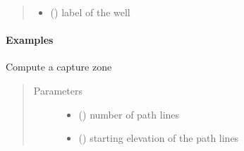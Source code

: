 \documentclass[letterpaper,10pt,english]{sphinxmanual}
\begin{document}
\begin{fulllineitems}
\begin{quote}
\begin{description}
\begin{itemize}
\item {} 
 (\sphinxstyleliteralemphasis{ (}\sphinxstyleliteralemphasis{)}) \textendash{} label of the well

\end{itemize}

\end{description}\end{quote}
\paragraph{Examples}

\begin{sphinxVerbatim}[commandchars=\\\{\}]
      
    \PYG{p}{[}   \PYG{p}{]}
\end{sphinxVerbatim}

\begin{fulllineitems}
\label{\detokenize{wells/well:timml.well.Well.capzone}}
Compute a capture zone
\begin{quote}\begin{description}
\item[{Parameters}] \leavevmode\begin{itemize}
\item {} 
 () \textendash{} number of path lines

\item {} 
 () \textendash{} starting elevation of the path lines


\end{itemize}
\end{description}
\end{quote}
\end{fulllineitems}
\end{fulllineitems}
\end{document}
